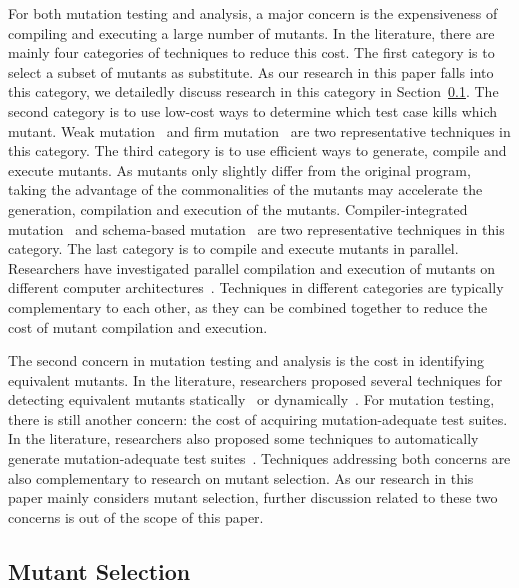 For both mutation testing and analysis, a major concern is the
expensiveness of compiling and executing a large number of
mutants. In the literature, there are mainly four categories of
techniques to reduce this cost. The first category is to select a
subset of mutants as substitute. As our research in this paper
falls into this category, we detailedly discuss research in this
category in Section~\ref{RelatedSelection}. The second category is
to use low-cost ways to determine which test case kills which
mutant. Weak mutation~\cite{Howden:82} and firm
mutation~\cite{Woodward:88} are two representative techniques in
this category. The third category is to use efficient ways to
generate, compile and execute mutants. As mutants only slightly
differ from the original program, taking the advantage of the
commonalities of the mutants may accelerate the generation,
compilation and execution of the mutants. Compiler-integrated
mutation~\cite{DeMillo:91} and schema-based
mutation~\cite{Untch:93} are two representative techniques in this
category. The last category is to compile and execute mutants in
parallel. Researchers have investigated parallel compilation and
execution of mutants on different computer
architectures~\cite{Krauser:88,Offutt:92}. Techniques in different
categories are typically complementary to each other, as they can
be combined together to reduce the cost of mutant compilation and
execution.

The second concern in mutation testing and analysis is the cost in
identifying equivalent mutants. In the literature, researchers
proposed several techniques for detecting equivalent mutants
statically~\cite{Offutt:94,Offutt:97,Hierons:99} or
dynamically~\cite{Grun:09,Schuler:09}. For mutation testing, there
is still another concern: the cost of acquiring mutation-adequate
test suites. In the literature, researchers also proposed some
techniques to automatically generate mutation-adequate test
suites~\cite{DeMillo:91b,Offutt:99,Liu:06}. Techniques addressing
both concerns are also complementary to research on mutant
selection. As our research in this paper mainly considers mutant
selection, further discussion related to these two concerns is out
of the scope of this paper.

\vspace{-1ex}
\subsection{Mutant Selection}
\label{RelatedSelection}

